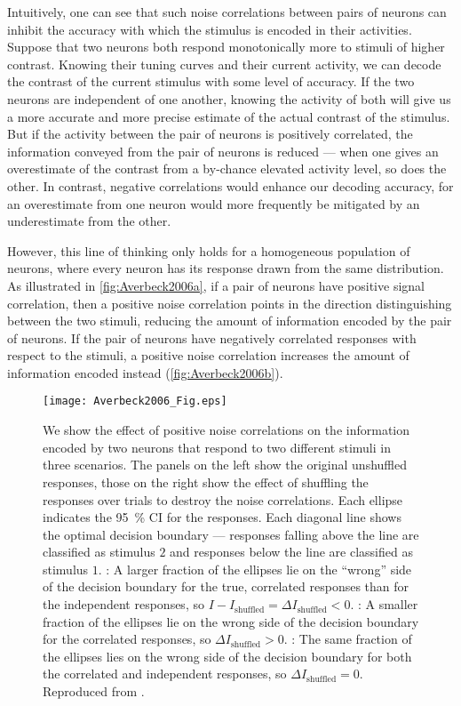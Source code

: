 Intuitively, one can see that such noise correlations between pairs of neurons can inhibit the accuracy with which the stimulus is encoded in their activities.
Suppose that two neurons both respond monotonically more to stimuli of higher contrast.
Knowing their tuning curves and their current activity, we can decode the contrast of the current stimulus with some level of accuracy.
If the two neurons are independent of one another, knowing the activity of both will give us a more accurate and more precise estimate of the actual contrast of the stimulus.
But if the activity between the pair of neurons is positively correlated, the information conveyed from the pair of neurons is reduced --- when one gives an overestimate of the contrast from a by-chance elevated activity level, so does the other.
In contrast, negative correlations would enhance our decoding accuracy, for an overestimate from one neuron would more frequently be mitigated by an underestimate from the other.

However, this line of thinking only holds for a homogeneous population of neurons, where every neuron has its response drawn from the same distribution.
As illustrated in \autoref{fig:Averbeck2006a}, if a pair of neurons have positive signal correlation, then a positive noise correlation points in the direction distinguishing between the two stimuli, reducing the amount of information encoded by the pair of neurons.
If the pair of neurons have negatively correlated responses with respect to the stimuli, a positive noise correlation increases the amount of information encoded instead (\autoref{fig:Averbeck2006b}).

\begin{figure}
\subfloat{\label{fig:Averbeck2006a}}
\subfloat{\label{fig:Averbeck2006b}}
\subfloat{\label{fig:Averbeck2006c}}
\centering
\texttt{[image: Averbeck2006\_Fig.eps]}
%
\caption{%
We show the effect of positive noise correlations on the information encoded by two neurons that respond to two different stimuli in three scenarios.
The panels on the left show the original unshuffled responses, those on the right show the effect of shuffling the responses over trials to destroy the noise correlations.
Each ellipse indicates the \SI{95}{\percent} \acf{CI} for the responses.
Each diagonal line shows the optimal decision boundary --- responses falling above the line are classified as stimulus $2$ and responses below the line are classified as stimulus $1$.
\protect{}: A larger fraction of the ellipses lie on the ``wrong'' side of the decision boundary for the true, correlated responses than for the independent responses, so $I-I_\text{shuffled} = \Delta I_\text{shuffled} < 0$.
\protect{}: A smaller fraction of the ellipses lie on the wrong side of the decision boundary for the correlated responses, so $\Delta I_\text{shuffled}>0$.
\protect{}: The same fraction of the ellipses lies on the wrong side of the decision boundary for both the correlated and independent responses, so $\Delta I_\text{shuffled} = 0$.
Reproduced from \citet{Averbeck2006}.
}
\label{fig:Averbeck2006}
\end{figure}


